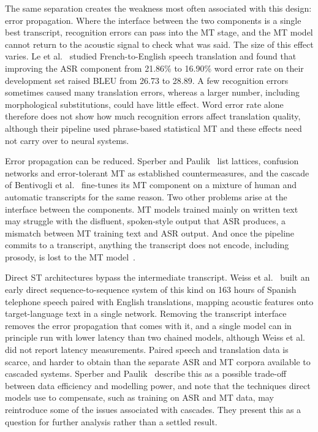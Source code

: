 The same separation creates the weakness most often associated with this
design: error propagation. Where the interface between the two components is
a single best transcript, recognition errors can pass into the MT stage, and
the MT model cannot return to the acoustic signal to check what was said.
The size of this effect varies. Le et al.~\cite{le2017disentangling} studied
French-to-English speech translation and found that improving the ASR
component from 21.86\% to 16.90\% word error rate on their development set
raised BLEU from 26.73 to 28.89. A few recognition errors sometimes caused
many translation errors, whereas a larger number, including morphological
substitutions, could have little effect. Word error rate alone therefore
does not show how much recognition errors affect translation quality,
although their pipeline used phrase-based statistical MT and these effects
need not carry over to neural systems.

Error propagation can be reduced. Sperber and
Paulik~\cite{sperber2020endtoend} list lattices, confusion networks and
error-tolerant MT as established countermeasures, and the cascade of Bentivogli
et al.~\cite{bentivogli2021cascade} fine-tunes its MT component on a mixture of
human and automatic transcripts for the same reason. Two other problems arise
at the interface between the components. MT models trained mainly on written
text may struggle with the disfluent, spoken-style output that ASR produces, a
mismatch between MT training text and ASR output. And once the pipeline commits
to a transcript, anything the transcript does not encode, including prosody, is
lost to the MT model~\cite{sperber2020endtoend}.

Direct ST architectures bypass the intermediate transcript. Weiss et
al.~\cite{weiss2017sequence} built an early direct sequence-to-sequence
system of this kind on 163 hours of Spanish telephone speech paired with
English translations, mapping acoustic features onto target-language text in
a single network. Removing the transcript interface removes the error
propagation that comes with it, and a single model can in principle run with
lower latency than two chained models, although Weiss et al. did not report
latency measurements. Paired speech and translation data is scarce, and
harder to obtain than the separate ASR and MT corpora available to cascaded
systems. Sperber and Paulik~\cite{sperber2020endtoend} describe this as a
possible trade-off between data efficiency and modelling power, and note
that the techniques direct models use to compensate, such as training on ASR
and MT data, may reintroduce some of the issues associated with cascades.
They present this as a question for further analysis rather than a settled
result.

